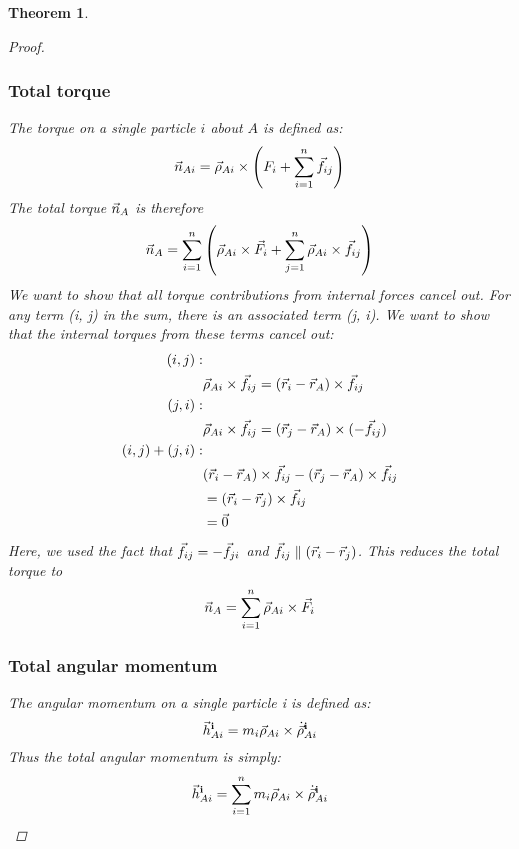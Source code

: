 \documentclass{article}
\newtheorem{theorem}{Theorem}
\begin{document}
\begin{theorem}
\begin{proof}
        \subsubsection*{Total torque}
        The torque on a single particle $i$ about $A$ is defined as:
        \begin{align*}
            \vec{n}_{Ai} = \vec{\rho}_{Ai}\times\left(F_i + \sum_{i=1}^n\vec{f}_{ij}\right)
        \end{align*}
        The total torque $\vec{n}_A$ is therefore
        $$\vec{n}_A = \sum_{i=1}^n\left(\vec{\rho}_{Ai}\times \vec{F}_i + \sum_{j=1}^n\vec{\rho}_{Ai}\times\vec{f}_{ij}\right)$$
        We want to show that all torque contributions from internal forces cancel out.
        For any term (i, j) in the sum, there is an associated term (j, i). We want to show that the internal torques from these terms cancel out:
        \begin{align*}
            (i, j):&{}\\
            &{}\vec{\rho}_{Ai}\times\vec{f}_{ij} = (\vec{r}_i-\vec{r}_A)\times\vec{f}_{ij}\\
            (j, i):&{}\\
            &{}\vec{\rho}_{Ai}\times\vec{f}_{ij} = (\vec{r}_j-\vec{r}_A)\times(-\vec{f}_{ij})\\
            (i, j) + (j, i):&{}\\
            &{}(\vec{r}_i-\vec{r}_A)\times\vec{f}_{ij} - (\vec{r}_j-\vec{r}_A)\times\vec{f}_{ij} \\
            &=(\vec{r}_i-\vec{r}_j)\times{\vec{f}_{ij}} \\
            &=\vec{0}
        \end{align*}
        Here, we used the fact that $\vec{f}_{ij}=-\vec{f}_{ji}$ and $\vec{f}_{ij} \parallel (\vec{r}_i-\vec{r}_j)$.
        This reduces the total torque to
        $$\vec{n}_A = \sum_{i=1}^n\vec{\rho}_{Ai}\times\vec{F}_i$$
        \subsubsection*{Total angular momentum}
        The angular momentum on a single particle i is defined as:
        $$\vec{h}_{Ai}^{\mathbf{i}} = m_i\vec{\rho}_{Ai}\times\dot{\vec{\rho}}_{Ai}^{\mathbf{i}}$$
        Thus the total angular momentum is simply:
        $$\vec{h}_{Ai}^{\mathbf{i}} =\sum_{i=1}^n m_i\vec{\rho}_{Ai}\times\dot{\vec{\rho}}_{Ai}^{\mathbf{i}}$$

\end{proof}
\end{theorem}
\end{document}
